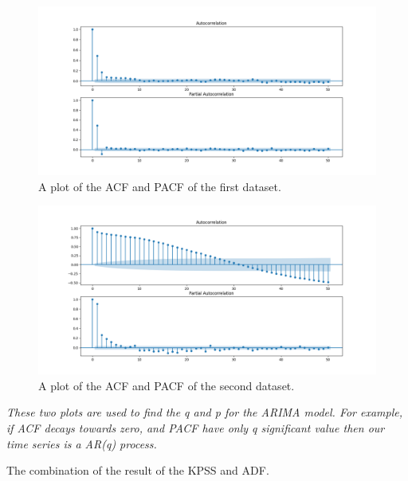 \documentclass[12pt]{article}
\begin{document}
\begin{enumerate}
\begin{figure}[H]
    \centering
    \begin{minipage}[b]{1\textwidth}
        \includegraphics[width=\textwidth]{figures/Ass1/Ass1_D1_PACF_ACF.png}
    \end{minipage}
    \caption{A plot of the \gls{ACF} and \gls{PACF} of the first dataset.}
    \label{fig:Ass1_D1_PACF_ACF}
\end{figure}

\begin{figure}[H]
    \centering
    \begin{minipage}[b]{1\textwidth}
        \includegraphics[width=\textwidth]{figures/Ass1/Ass1_D2_PACF_ACF.png}
    \end{minipage}
    \caption{A plot of the \gls{ACF} and \gls{PACF} of the second dataset.}
    \label{fig:Ass1_D2_PACF_ACF}
\end{figure}


\textit{These two plots are used to find the q and p for the ARIMA model. For example, if \gls{ACF} decays towards zero, and \gls{PACF} have only q significant value then our time series is a AR(q) process.}

\begin{table}[H]
\centering
\caption{The combination of the result of the \gls{KPSS} and \gls{ADF}.}
\label{tab:1}

\end{table}


\end{enumerate}
\end{document}
